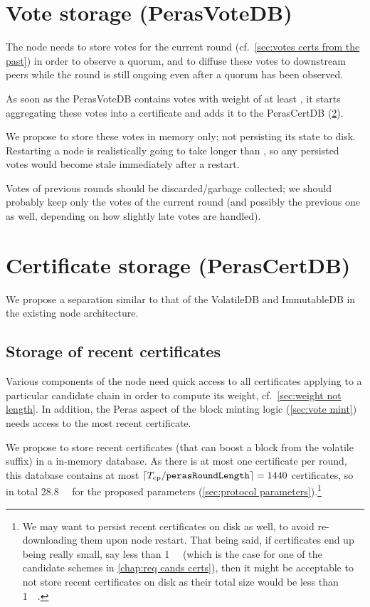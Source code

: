 \section{Vote storage (PerasVoteDB)}\label{sec:vote db}

The node needs to store votes for the current round (cf.~\cref{sec:votes certs from the past}) in order to observe a quorum, and to diffuse these votes to downstream peers while the round is still ongoing even after a quorum has been observed.

As soon as the PerasVoteDB contains votes with weight of at least \perasQuorum, it starts aggregating these votes into a certificate and adds it to the PerasCertDB (\cref{sec:cert db}).

We propose to store these votes in memory only; not persisting its state to disk.
Restarting a node is realistically going to take longer than \perasRoundSlots{}, so any persisted votes would become stale immediately after a restart.

Votes of previous rounds should be discarded/garbage collected; we should probably keep only the votes of the current round (and possibly the previous one as well, depending on how slightly late votes are handled).

\section{Certificate storage (PerasCertDB)}\label{sec:cert db}

We propose a separation similar to that of the VolatileDB and ImmutableDB in the existing node architecture.

\subsection{Storage of recent certificates}
Various components of the node need quick access to all certificates applying to a particular candidate chain in order to compute its weight, cf.~\cref{sec:weight not length}.
In addition, the Peras aspect of the block minting logic (\cref{sec:vote mint}) needs access to the most recent certificate.

We propose to store recent certificates (that can boost a block from the volatile suffix) in a in-memory database. As there is at most one certificate per round, this database contains at most $\lceil T_{\text{cp}} / \mathtt{perasRoundLength} \rceil = 1440$ certificates, so in total \qty{28.8}{\mega\byte} for the proposed parameters (\cref{sec:protocol parameters}).\footnote{We may want to persist recent certificates on disk as well, to avoid re-downloading them upon node restart. That being said, if certificates end up being really small, say less than \qty{1}{\kilo\byte} (which is the case for one of the candidate schemes in \cref{chap:req cands certs}), then it might be acceptable to not store recent certificates on disk as their total size would be less than \qty{1}{\mega\byte}.}

